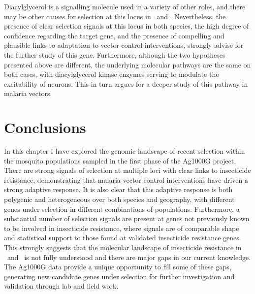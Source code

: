 \begin{refsection}
Diacylglycerol is a signalling molecule used in a variety of other roles, and there may be other causes for selection at this locus in \agam\ and \acol.
%
Nevertheless, the presence of clear selection signals at this locus in both species, the high degree of confidence regarding the target gene, and the presence of compelling and plausible links to adaptation to vector control interventions, strongly advise for the further study of this gene.
%
Furthermore, although the two hypotheses presented above are different, the underlying molecular pathways are the same on both cases, with diacylglycerol kinase enzymes serving to modulate the excitability of neurons.
%
This in turn argues for a deeper study of this pathway in malaria vectors.


\section{Conclusions}\label{sec:ch5-conclusions}


In this chapter I have explored the genomic landscape of recent selection within the mosquito populations sampled in the first phase of the Ag1000G project.
%
There are strong signals of selection at multiple loci with clear links to insecticide resistance, demonstrating that malaria vector control interventions have driven a strong adaptive response.
%
It is also clear that this adaptive response is both polygenic and heterogeneous over both species and geography, with different genes under selection in different combinations of populations.
%
Furthermore, a substantial number of selection signals are present at genes not previously known to be involved in insecticide resistance, where signals are of comparable shape and statistical support to those found at validated insecticide resistance genes.
%
This strongly suggests that the molecular landscape of insecticide resistance in \agam\ and \acol\ is not fully understood and there are major gaps in our current knowledge.
%
The Ag1000G data provide a unique opportunity to fill some of these gaps, generating new candidate genes under selection for further investigation and validation through lab and field work.



\end{refsection}
